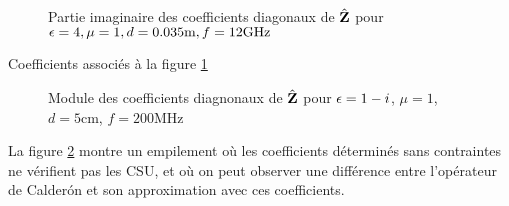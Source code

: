       \begin{figure}[!hbt]
          \centering
          
          \caption[Partie imaginaire de l'opérateur de Calderón, comparé avec les approximations CI0, CI3 pour une couche plane de matériau sans pertes de P.~Soudais]{Partie imaginaire des coefficients diagonaux de \(\hat{\mathbf{Z}}\) pour \(\epsilon = 4, \mu = 1, d=0.035\text{m}, f=12\text{GHz}\)}
          \label{fig:imp_fourier:plan:soudais:hoibc}
      \end{figure}
      \begin{table}[!hbt]
        \centering
        \caption{Coefficients associés à la figure \ref{fig:imp_fourier:plan:soudais:hoibc}}
        \label{tab:imp_fourier:plan:soudais:hoibc}
      \end{table}


      \begin{figure}[!hbt]
        \centering
        
        \caption[Module de la matrice d'impédance pour le matériau M1, perte de précision à cause de la CSU]{ Module des coefficients diagnonaux de \(\hat{\mathbf{Z}}\) pour \(\epsilon = 1-i\), \(\mu = 1\), \(d=5\)cm, \(f=200\)MHz}
        \label{fig:imp_fourier:plan:stupfel:hoibc_vs_csu}
      \end{figure}

      La figure \ref{fig:imp_fourier:plan:stupfel:hoibc_vs_csu} montre un empilement où les coefficients déterminés sans contraintes ne vérifient pas les CSU, et où on peut observer une différence entre l'opérateur de Calderón et son approximation avec ces coefficients.

